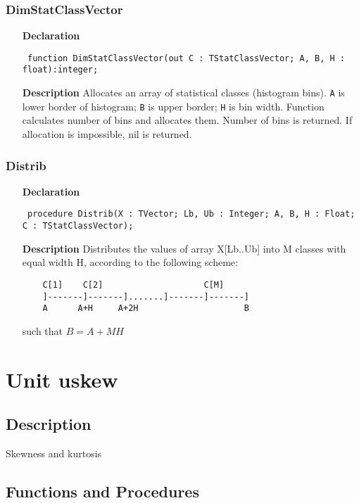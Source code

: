 \documentclass[12pt,a4paper,oneside]{report}
\newcommand{\declarationitem}[1]{\textbf{#1}}
\newcommand{\descriptiontitle}[1]{\textbf{#1}}
\newcommand{\code}[1]{\texttt{#1}}
\begin{document}
\subsubsection{DimStatClassVector}
\label{udistrib-DimStatClassVector}
\begin{itemize}\item[\declarationitem{Declaration}\hfill]
	\begin{flushleft}
		\code{
			function DimStatClassVector(out C : TStatClassVector; A, B, H : float):integer;}
	\end{flushleft}
	\item[\descriptiontitle{Description}]
	Allocates an array of statistical classes (histogram bins).
	\code{A} is lower border of histogram; \code{B} is upper border; \code{H} is bin width.
	Function calculates number of bins and allocates them. Number of bins is returned. If allocation is impossible, nil is returned.
\end{itemize}
\subsubsection{Distrib}
\label{udistrib-Distrib}
\begin{itemize}\item[\declarationitem{Declaration}\hfill]
	\begin{flushleft}
		\code{
			procedure Distrib(X : TVector; Lb, Ub : Integer; A, B, H : Float; C : TStatClassVector);}
	\end{flushleft}
	\item[\descriptiontitle{Description}]
	Distributes the values of array X[Lb..Ub] into M classes with equal width H, according to the following scheme:
	\begin{verbatim}
	C[1]    C[2]                    C[M]
	]-------]-------].......]-------]-------]
	A      A+H     A+2H                     B
	\end{verbatim}	
	such that $ B = A + M H$
	
\end{itemize}
\section{Unit uskew}
\label{uskew}
\subsection{Description}
Skewness and kurtosis
\subsection{Functions and Procedures}
\end{document}

